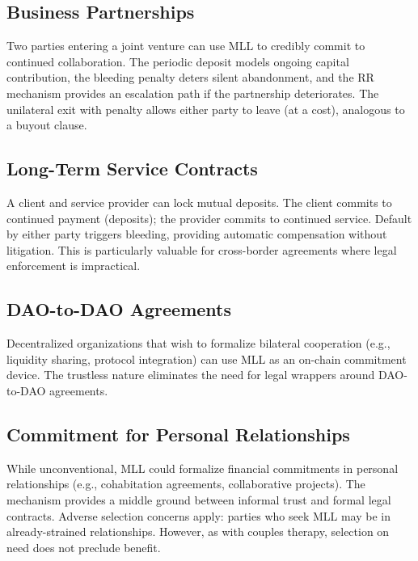 \documentclass[12pt,a4paper]{article}
\begin{document}
\subsection{Business Partnerships}

Two parties entering a joint venture can use MLL to credibly commit to continued collaboration. The periodic deposit models ongoing capital contribution, the bleeding penalty deters silent abandonment, and the RR mechanism provides an escalation path if the partnership deteriorates. The unilateral exit with penalty allows either party to leave (at a cost), analogous to a buyout clause.

\subsection{Long-Term Service Contracts}

A client and service provider can lock mutual deposits. The client commits to continued payment (deposits); the provider commits to continued service. Default by either party triggers bleeding, providing automatic compensation without litigation. This is particularly valuable for cross-border agreements where legal enforcement is impractical.

\subsection{DAO-to-DAO Agreements}

Decentralized organizations that wish to formalize bilateral cooperation (e.g., liquidity sharing, protocol integration) can use MLL as an on-chain commitment device. The trustless nature eliminates the need for legal wrappers around DAO-to-DAO agreements.

\subsection{Commitment for Personal Relationships}

While unconventional, MLL could formalize financial commitments in personal relationships (e.g., cohabitation agreements, collaborative projects). The mechanism provides a middle ground between informal trust and formal legal contracts. Adverse selection concerns apply: parties who seek MLL may be in already-strained relationships. However, as with couples therapy, selection on need does not preclude benefit.


\end{document}
